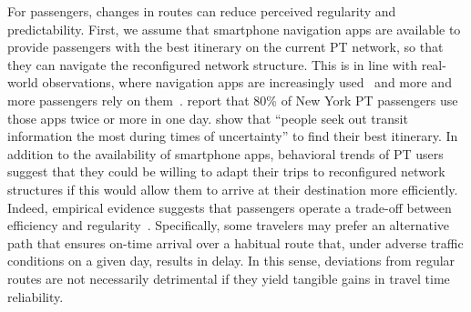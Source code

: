 \documentclass[a4paper,fleqn]{cas-sc}
\begin{document}
For passengers, changes in routes can reduce perceived regularity and predictability. First, we assume that smartphone navigation apps are available to provide passengers with the best itinerary on the current PT network, so that they can navigate the reconfigured network structure. This is in line with real-world observations, where navigation apps are increasingly used~\citep {SmartphoneUse2016} and more and more passengers rely on them~\citep{durand2024digital}. \cite[p 147]{ghahramani2016trends} report that 80\% of New York PT passengers use those apps twice or more in one day. \cite{Shalaby2024} show that ``people seek out transit information the most during times of uncertainty'' to find their best itinerary.
%
In addition to the availability of smartphone apps, behavioral trends of PT users suggest that they could be willing to adapt their trips to reconfigured network structures if this would allow them to arrive at their destination more efficiently.
Indeed, empirical evidence suggests that passengers operate a trade-off between efficiency and regularity~\citep{devarasetty2012value}. Specifically, some travelers may prefer an alternative path that ensures on-time arrival over a habitual route that, under adverse traffic conditions on a given day, results in delay. In this sense, deviations from regular routes are not necessarily detrimental if they yield tangible gains in travel time reliability. 
\end{document}
